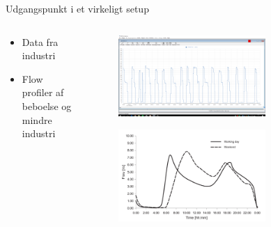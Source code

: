 \begin{frame}{Udgangspunkt i et virkeligt setup}{}
\vfill\vfill\centering


	\begin{columns}
	\begin{column}{0.4\textwidth}
		\begin{itemize}
			\vspace{17mm}
			\item Data fra industri
			\vspace{4mm}
			\item Flow profiler af beboelse og mindre industri
		\end{itemize}
	\end{column}

	\begin{column}{0.6\textwidth}
		\begin{figure}[H]
			\centering
			\includegraphics[width=0.7\textwidth]{Sections/pictures/Carlsberg_data.png}
		\end{figure}
		\begin{figure}[H]
			\centering
			\includegraphics[width=0.7\textwidth]{Sections/pictures/poopflow.png}
		\end{figure}
	\end{column}
\end{columns}



\vfill\vfill	
\end{frame}

